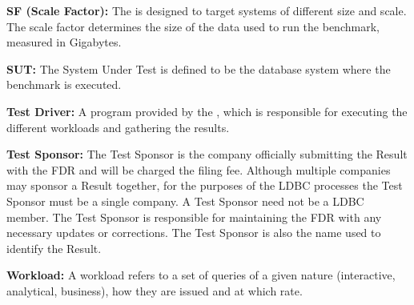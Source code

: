 {\flushleft \textbf{SF (Scale Factor):}} The \ldbcsnb is designed to target systems of
different size and scale. The scale factor determines the size of the data used
to run the benchmark, measured in Gigabytes.


{\flushleft \textbf{SUT:}} The System Under Test  is defined
to be the database system where the benchmark is executed.


{\flushleft \textbf{Test Driver:}}  A program provided by the \ldbcsnb, which
is responsible for executing the different workloads and gathering the results.

{\flushleft \textbf{Test Sponsor:}} The Test Sponsor is the company officially
submitting the Result with the FDR and will be charged the filing fee. Although
multiple companies may sponsor a Result together, for the purposes of the LDBC
processes the Test Sponsor must be a single company. A Test Sponsor need not be
a LDBC member. The Test Sponsor is responsible for maintaining the FDR with any
necessary updates or corrections. The Test Sponsor is also the name used to
identify the Result.

%



{\flushleft \textbf{Workload:}} A workload refers to a set of queries of a given nature
(\ie interactive, analytical, business), how they are issued and at which rate.
